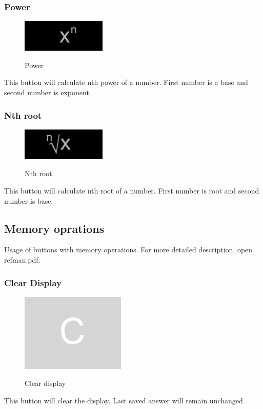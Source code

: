 \documentclass[11pt, a4paper]{article}
\begin{document}
    \subsubsection{Power}
    \label{subsubsec:power}
    \begin{figure}[hbt!]
        \caption{Power}
        \includegraphics[scale = 0.2]{n-th_power}
        \centering
        \label{fig:pow}
    \end{figure}
    This button will calculate nth power of a number. First number is a base and second number is exponent.

    \subsubsection{Nth root}
    \label{subsubsec:nthroot}
    \begin{figure}[hbt!]
        \caption{Nth root}
        \includegraphics[scale = 0.2]{n-th_root}
        \centering
        \label{fig:root}
    \end{figure}

    This button will calculate nth root of a number. First number is root and second number is base.
    \newpage

    \subsection{Memory oprations}
    Usage of buttons with memory operations.
    For more detailed description, open refman.pdf.
    \label{subsec:memoryoperations}

    \subsubsection{Clear Display }

    \label{subsubsec:cleardisplay}

    \begin{figure}[hbt!]
        \caption{Clear display}
        \includegraphics[scale = 0.2]{clear_display}
        \centering
        \label{fig:ac}
    \end{figure}
    This button will clear the display. Last saved answer will remain unchanged
\end{document}
